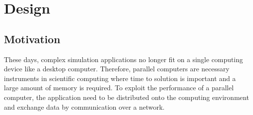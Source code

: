 \chapter{Design}
\label{sec:design}



\section{Motivation}
\label{sec:motivation}

These days, complex simulation applications no longer fit on a single
computing device like a desktop computer. Therefore, parallel
computers are necessary instruments in scientific computing where time
to solution is important and a large amount of memory is required.  To
exploit the performance of a parallel computer, the application need
to be distributed onto the computing environment and exchange data by
communication over a network.

